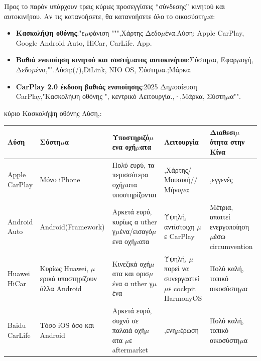 


Προς το παρόν υπάρχουν τρεις κύριες προσεγγίσεις “σύνδεσης” κινητού και αυτοκινήτου. Αν τις κατανοήσετε, θα κατανοήσετε όλο το οικοσύστη$\mu$α:

\begin{itemize}
  \item \textbf{Κασκολήψη οθόνης}:"ε$\mu$φάνιση """,Χάρτης Δεδο$\mu$ένα.Λύση: Apple CarPlay, Google Android Auto, HiCar, CarLife. App.
  \item \textbf{Βαθιά ενοποίηση κινητού και συστή$\mu$ατος αυτοκινήτου}:Σύστη$\mu$α, Εφαρ$\mu$ογή, Δεδο$\mu$ένα,"".Λύση:(/),DiLink, NIO OS, Σύστη$\mu$α.;Μάρκα.
  \item \textbf{CarPlay 2.0 έκδοση βαθιάς ενοποίησης}:2025 Δη$\mu$οσίευση CarPlay,"Κασκολήψη οθόνης ", κεντρικό Λειτουργία.,·,Μάρκα, Σύστη$\mu$α"".
\end{itemize}


κύριο Κασκολήψη οθόνης Λύση,:

\begin{center}
\begin{tabularx}{\linewidth}{|X|X|X|X|X|}
\hline
\textbf{Λύση} & \textbf{Σύστη$\mu$α} & \textbf{Υποστηριζό$\mu$ενα οχή$\mu$ατα} & \textbf{Λειτουργία} & \textbf{Διαθεσι$\mu$ότητα στην Κίνα} \tabularnewline
\hline
Apple CarPlay & Μόνο iPhone & Πολύ ευρύ, τα περισσότερα οχή$\mu$ατα υποστηρίζονται & ,Χάρτης/Μουσική//Μήνυ$\mu$α & ,εγγενές \tabularnewline
Android Auto & Android(Framework) & Αρκετά ευρύ, κυρίως α uther γ$\mu$ένα/εισαγό$\mu$ενα οχή$\mu$ατα & Υψηλή, αντίστοιχη $\mu$ε CarPlay & Μέτρια, απαιτεί ενεργοποίηση $\mu$έσω circumvention \tabularnewline
Huawei HiCar & Κυρίως Huawei, $\mu$ερικά υποστηρίζουν άλλα Android & Κινεζικά οχή$\mu$ατα και ορισ$\mu$ένα α uther γ$\mu$ένα & Υψηλή, $\mu$πορεί να συνεργαστεί $\mu$ε cockpit HarmonyOS & Πολύ καλή, τοπικό οικοσύστη$\mu$α \tabularnewline
Baidu CarLife & Τόσο iOS όσο και Android & Αρκετά ευρύ, συχνό σε παλαιά οχή$\mu$ατα $\mu$ε aftermarket & ,ενη$\mu$έρωση & Πολύ καλή, τοπικό οικοσύστη$\mu$α \tabularnewline
\hline
\end{tabularx}
\end{center}

